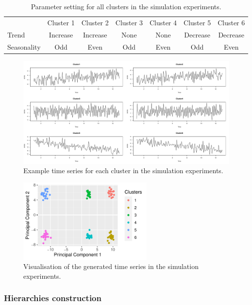 \documentclass[a4paper,review,12pt,authoryear]{elsarticle}
\begin{document}
\begin{table}
\caption{\label{table:simu_params}Parameter setting for all clusters in the simulation experiments.}
\centering
\begin{tabular}{lcccccc}\toprule
& Cluster 1 & Cluster 2 & Cluster 3 & Cluster 4 & Cluster 5 & Cluster 6 \\
Trend & Increase & Increase & None & None & Decrease & Decrease \\
Seasonality & Odd & Even & Odd & Even & Odd & Even  \\
    \bottomrule
\end{tabular}
\end{table}

\begin{figure}
\centering
\includegraphics[width=\textwidth]{figures/simu_example.pdf}
\caption{\label{fig:simu_emps}Example time series for each cluster in the simulation experiments.}
\end{figure}

\begin{figure}
    \centering
    \includegraphics[width=0.6\textwidth]{figures/simu_pca.pdf}
    \caption{\label{fig:simu_pca}Visualisation of the generated time series in the simulation experiments.}
\end{figure}


\subsubsection*{Hierarchies construction}
\end{document}
